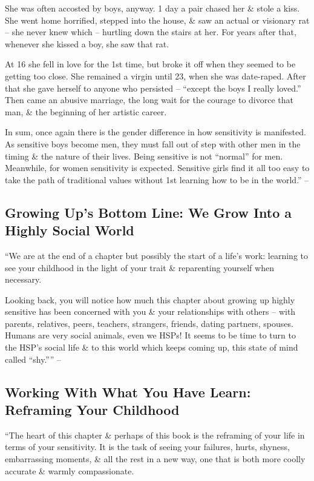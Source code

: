 \documentclass{article}
\numberwithin{equation}{section}
\begin{document}
She was often accosted by boys, anyway. 1 day a pair chased her \& stole a kiss. She went home horrified, stepped into the house, \& saw an actual or visionary rat -- she never knew which -- hurtling down the stairs at her. For years after that, whenever she kissed a boy, she saw that rat.

At 16 she fell in love for the 1st time, but broke it off when they seemed to be getting too close. She remained a virgin until 23, when she was date-raped. After that she gave herself to anyone who persisted -- ``except the boys I really loved.'' Then came an abusive marriage, the long wait for the courage to divorce that man, \& the beginning of her artistic career.

In sum, once again there is the gender difference in how sensitivity is manifested. As sensitive boys become men, they must fall out of step with other men in the timing \& the nature of their lives. Being sensitive is not ``normal'' for men. Meanwhile, for women sensitivity is expected. Sensitive girls find it all too easy to take the path of traditional values without 1st learning how to be in the world.'' -- \cite[pp. 118--120]{Aron2013}

\subsection{Growing Up's Bottom Line: We Grow Into a Highly Social World}
``We are at the end of a chapter but possibly the start of a life's work: learning to see your childhood in the light of your trait \& reparenting yourself when necessary.

Looking back, you will notice how much this chapter about growing up highly sensitive has been concerned with you \& your relationships with others -- with parents, relatives, peers, teachers, strangers, friends, dating partners, spouses. Humans are very social animals, even we HSPs! It seems to be time to turn to the HSP's social life \& to this world which keeps coming up, this state of mind called ``shy.'''' -- \cite[p. 120]{Aron2013}

\subsection{Working With What You Have Learn: Reframing Your Childhood}
``The heart of this chapter \& perhaps of this book is the reframing of your life in terms of your sensitivity. It is the task of seeing your failures, hurts, shyness, embarrassing moments, \& all the rest in a new way, one that is both more coolly accurate \& warmly compassionate.
\end{document}
